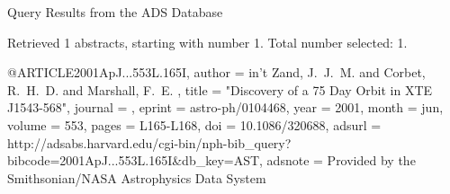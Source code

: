 Query Results from the ADS Database


Retrieved 1 abstracts, starting with number 1.  Total number selected: 1.

@ARTICLE{2001ApJ...553L.165I,
   author = {{in't Zand}, J.~J.~M. and {Corbet}, R.~H.~D. and {Marshall}, F.~E.
	},
    title = "{Discovery of a 75 Day Orbit in XTE J1543-568}",
  journal = {\apjl},
   eprint = {astro-ph/0104468},
     year = 2001,
    month = jun,
   volume = 553,
    pages = {L165-L168},
      doi = {10.1086/320688},
   adsurl = {http://adsabs.harvard.edu/cgi-bin/nph-bib_query?bibcode=2001ApJ...553L.165I&db_key=AST},
  adsnote = {Provided by the Smithsonian/NASA Astrophysics Data System}
}


